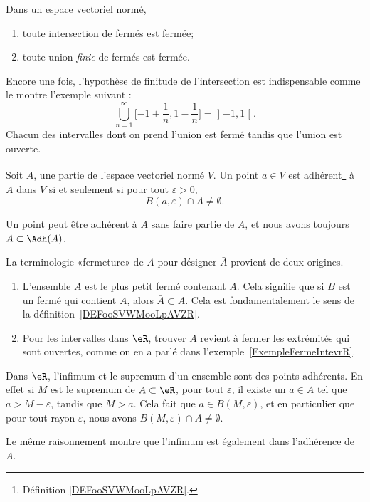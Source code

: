 \begin{proposition}
	Dans un espace vectoriel normé,
	\begin{enumerate}
		\item
		      toute intersection de fermés est fermée;
		\item
		      toute union \emph{finie} de fermés est fermée.
	\end{enumerate}
\end{proposition}
Encore une fois, l'hypothèse de finitude de l'intersection est indispensable comme le montre l'exemple suivant :
\begin{equation}
	\bigcup_{n=1}^{\infty}\mathopen[ -1+\frac{1}{ n } , 1-\frac{1}{ n } \mathclose]=\mathopen] -1 , 1 \mathclose[.
\end{equation}
Chacun des intervalles dont on prend l'union est fermé tandis que l'union est ouverte.

\begin{lemma}       \label{LEMooHPQTooHKdoiL}
	Soit \( A\), une partie de l'espace vectoriel normé \( V\). Un point \( a\in V\) est adhérent\footnote{Définition \ref{DEFooSVWMooLpAVZR}.} à \( A\) dans \( V\) si et seulement si pour tout \( \varepsilon>0\),
	\begin{equation}
		B(a,\varepsilon)\cap A\neq\emptyset.
	\end{equation}
\end{lemma}
Un point peut être adhérent à \( A\) sans faire partie de \( A\), et nous avons toujours \( A\subset\Adh(A)\).

\begin{example}     \label{EXooICLBooJzQFNY}
	La terminologie «fermeture» de \( A\) pour désigner \( \bar A\) provient de deux origines.
	\begin{enumerate}
		\item
		      L'ensemble \( \bar A\) est le plus petit fermé contenant \( A\). Cela signifie que si \( B\) est un fermé qui contient \( A\), alors \( \bar A\subset A\). Cela est fondamentalement le sens de la définition~\ref{DEFooSVWMooLpAVZR}.
		\item
		      Pour les intervalles dans \( \eR\), trouver \( \bar A\) revient à fermer les extrémités qui sont ouvertes, comme on en a parlé dans l'exemple~\ref{ExempleFermeIntevrR}.
	\end{enumerate}
\end{example}

\begin{example}
	Dans \( \eR\), l'infimum et le supremum d'un ensemble sont des points adhérents. En effet si \( M\) est le supremum de \( A\subset\eR\), pour tout \( \varepsilon\), il existe un \( a\in A\) tel que \( a>M-\varepsilon\), tandis que \( M>a\). Cela fait que \( a\in B(M,\varepsilon)\), et en particulier que pour tout rayon \( \varepsilon\), nous avons \( B(M,\varepsilon)\cap A\neq\emptyset\).

	Le même raisonnement montre que l'infimum est également dans l'adhérence de \( A\).
\end{example}

